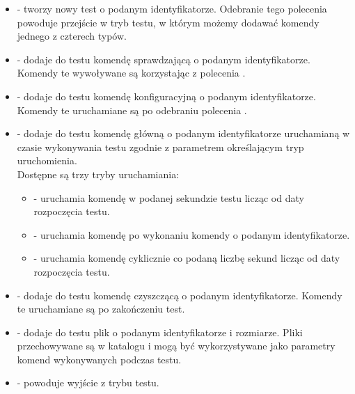 \documentclass[00-praca-magisterska.tex]{subfiles}
\begin{document}
\begin{itemize}
  \setlength{\itemsep}{10pt}

\item{ - tworzy nowy test o podanym
identyfikatorze. Odebranie tego polecenia powoduje przejście w tryb testu, w
którym możemy dodawać komendy jednego z czterech typów.}

\item{ - dodaje do testu komendę
sprawdzającą o podanym identyfikatorze. Komendy te wywoływane są korzystając z
polecenia .}

\item{ - dodaje do testu komendę
konfiguracyjną o podanym identyfikatorze. Komendy te uruchamiane są po odebraniu
polecenia .}

\item{ -
dodaje do testu komendę główną o podanym identyfikatorze uruchamianą w czasie
wykonywania testu zgodnie z parametrem określającym tryp uruchomienia. \\

Dostępne są trzy tryby uruchamiania: \\

\begin{itemize}
  \setlength{\itemsep}{10pt}

\item{ - uruchamia komendę w podanej sekundzie testu licząc
od daty rozpoczęcia testu.}
\item{ - uruchamia komendę po wykonaniu komendy o
podanym identyfikatorze.} 
\item{ - uruchamia komendę cyklicznie co podaną liczbę
sekund licząc od daty rozpoczęcia testu.}

\end{itemize}}

\item{ - dodaje do testu komendę
czyszczącą o podanym identyfikatorze. Komendy te uruchamiane są po zakończeniu
test.}

\item{ - dodaje do testu
plik o podanym identyfikatorze i rozmiarze. Pliki przechowywane są w katalogu
 i mogą być wykorzystywane jako parametry komend wykonywanych podczas
testu.}

\item{ - powoduje wyjście z trybu testu.}

\end{itemize}
\end{document}
